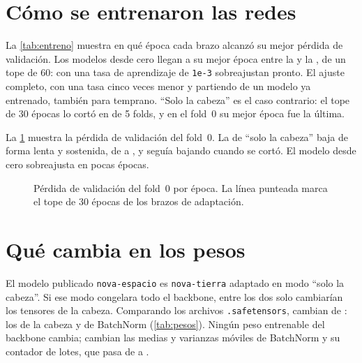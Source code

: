 \section{Cómo se entrenaron las redes}\label{sec:entreno}

La \cref{tab:entreno} muestra en qué época cada brazo alcanzó su mejor pérdida de validación. Los modelos desde cero
llegan a su mejor época entre la  y la , de un tope de 60: con una tasa de
aprendizaje de \texttt{1e-3} sobreajustan pronto. El ajuste completo, con una tasa cinco veces menor y partiendo de un
modelo ya entrenado, también para temprano. \enquote{Solo la cabeza} es el caso contrario: el tope de 30 épocas lo
cortó en  de 5 folds, y en el fold~0 su mejor época fue la última.

\begin{table}[htbp]
\caption[Épocas de entrenamiento por brazo y fold]{Mejor época de cada brazo y fold (contada desde 1). En negrita, una
mejor época igual al tope. \enquote{Cortados por el tope}: folds en que el tope llegó antes de que la paciencia de 6
épocas pudiera detener el entrenamiento.}
\label{tab:entreno}
\small

\end{table}

La \cref{fig:historia} muestra la pérdida de validación del fold~0. La de \enquote{solo la cabeza} baja de forma lenta y
sostenida, de  a , y seguía bajando cuando se cortó. El modelo
desde cero sobreajusta en pocas épocas.

\begin{figure}[htbp]
\centering

\caption[Pérdida de validación en el fold 0]{Pérdida de validación del fold~0 por época. La línea punteada marca el
tope de 30 épocas de los brazos de adaptación.}
\label{fig:historia}
\end{figure}

\section{Qué cambia en los pesos}\label{sec:pesos}

El modelo publicado \texttt{nova-espacio} es \texttt{nova-tierra} adaptado en modo \enquote{solo la cabeza}. Si ese
modo congelara todo el backbone, entre los dos solo cambiarían los tensores de la cabeza. Comparando los archivos
\texttt{.safetensors}, cambian  de : los  de la cabeza
y  de BatchNorm (\cref{tab:pesos}). Ningún peso entrenable del backbone cambia; cambian las medias y
varianzas móviles de BatchNorm y su contador de lotes, que pasa de  a .

